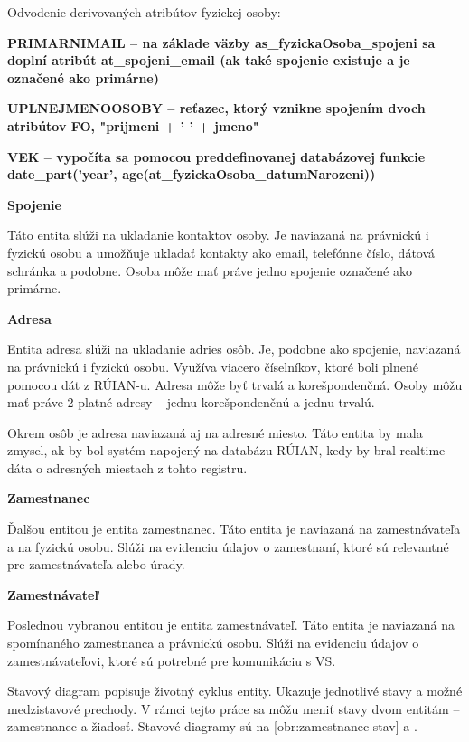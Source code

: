 \blank
Odvodenie derivovaných atribútov fyzickej osoby: %



\startitemize
\item {\start\bf PRIMARNIMAIL \stop -- na základe väzby as_fyzickaOsoba_spojeni sa doplní atribút at_spojeni_email (ak také spojenie existuje a je označené ako primárne)}
\item {\start\bf UPLNEJMENOOSOBY \stop -- reťazec, ktorý vznikne spojením dvoch atribútov FO, "prijmeni + ' ' + jmeno"}
\item {\start\bf VEK \stop -- vypočíta sa pomocou preddefinovanej databázovej funkcie \zlom date_part('year', age(at_fyzickaOsoba_datumNarozeni)) }
\stopitemize

\blank
\start\bf Spojenie \stop

Táto entita slúži na ukladanie kontaktov osoby. Je naviazaná na právnickú i fyzickú osobu a umožňuje ukladať kontakty ako email, telefónne číslo, dátová schránka a podobne. Osoba môže mať práve jedno spojenie označené ako primárne.

\blank
\start\bf Adresa \stop

Entita adresa slúži na ukladanie adries osôb. Je, podobne ako spojenie, naviazaná na právnickú i fyzickú osobu. Využíva viacero číselníkov, ktoré boli plnené pomocou dát z RÚIAN-u. Adresa môže byť trvalá a korešpondenčná. Osoby môžu mať práve 2 platné adresy -- jednu korešpondenčnú a jednu trvalú.

Okrem osôb je adresa naviazaná aj na adresné miesto. Táto entita by mala zmysel, ak by bol systém napojený na databázu RÚIAN, kedy by bral realtime dáta o adresných miestach z tohto registru.

\blank
\start\bf Zamestnanec \stop

Ďalšou entitou je entita zamestnanec. Táto entita je naviazaná na zamestnávateľa a na fyzickú osobu. Slúži na evidenciu údajov o zamestnaní, ktoré sú relevantné pre zamestnávateľa alebo úrady.

\blank
\start\bf Zamestnávateľ \stop

Poslednou vybranou entitou je entita zamestnávateľ. Táto entita je naviazaná na spomínaného zamestnanca a právnickú osobu. Slúži na evidenciu údajov o zamestnávateľovi, ktoré sú potrebné pre komunikáciu s VS.

Stavový diagram popisuje životný cyklus entity. Ukazuje jednotlivé stavy a možné medzistavové prechody. V rámci tejto práce sa môžu meniť stavy dvom entitám -- zamestnanec a žiadosť. Stavové diagramy sú na [obr:zamestnanec-stav] a .

